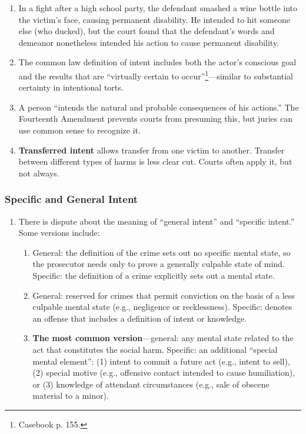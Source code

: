 \begin{enumerate}
    \item In a fight after a high school party, the defendant smashed a wine bottle into the victim's face, causing permanent disability. He intended to hit someone else (who ducked), but the court found that the defendant's words and demeanor nonetheless intended his action to cause permanent disability.
    \item The common law definition of intent includes both the actor's conscious goal and the results that are ``virtually certain to occur''\footnote{Casebook p. 155.}---similar to substantial certainty in intentional torts.
    \item A person ``intends the natural and probable consequences of his actions.'' The Fourteenth Amendment prevents courts from presuming this, but juries can use common sense to recognize it.
    \item \textbf{Transferred intent}  allows transfer from one victim to another. Transfer between different types of harms is less clear cut. Courts often apply it, but not always.
\end{enumerate}

\subsubsection{Specific and General Intent}

\begin{enumerate}
    \item There is dispute about the meaning of ``general intent'' and ``specific intent.'' Some versions include:
    \begin{enumerate}
        \item General: the definition of the crime sets out no specific mental state, so the prosecutor needs only to prove a generally culpable state of mind. Specific: the definition of a crime explicitly sets out a mental state.
        \item General: reserved for crimes that permit conviction on the basis of a less culpable mental state (e.g., negligence or recklessness). Specific: denotes an offense that includes a definition of intent or knowledge.
        \item \textbf{The most common version}---general: any mental state related to the act that constitutes the social harm. Specific: an additional ``special mental element'': (1) intent to commit a future act (e.g., intent to sell), (2) special motive (e.g., offensive contact intended to cause humiliation), or (3) knowledge of attendant circumstances (e.g., sale of obscene material to a minor).
    \end{enumerate}
\end{enumerate}


